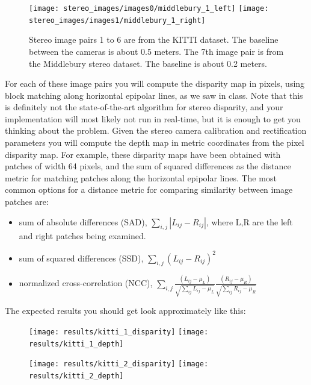 \documentclass[a4paper,10pt]{article}
\begin{document}
    
\begin{figure}[h!]
  \begin{center}    
    \texttt{[image: stereo\_images/images0/middlebury\_1\_left]}
    \texttt{[image: stereo\_images/images1/middlebury\_1\_right]}
  \end{center} 
  \caption{Stereo image pairs 1 to 6 are from the KITTI dataset. The baseline between the cameras is about 0.5 meters. The 7th image pair is from the Middlebury stereo dataset. The baseline is about 0.2 meters.}
  \label{fig:kitti_stereo}
\end{figure}
\noindent For each of these image pairs you will compute the disparity map in pixels, using block matching along horizontal epipolar lines, as we saw in class. Note that this is definitely not the state-of-the-art
algorithm for stereo disparity, and your implementation will most likely not run in real-time, but it is enough to get you thinking about the problem. 
\newline
\newline
\noindent Given the stereo camera calibration and rectification parameters 
you will compute the depth map in metric coordinates from the pixel disparity map. For example, these disparity maps have been obtained with patches of width 64 pixels, and the sum of squared differences as the distance 
metric for matching patches along the horizontal epipolar lines. The most common options for a distance metric for comparing similarity between image patches are:
\begin{itemize}
 \item sum of absolute differences (SAD), $\sum_{i,j}|L_{ij} - R_{ij}|$, where L,R are the left and right patches being examined.
 \item sum of squared differences (SSD), $\sum_{i,j}(L_{ij} - R_{ij})^2$
 \item normalized cross-correlation (NCC), $\sum_{i,j} \frac{(L_{ij} - \mu_L)}{\sqrt{\sum_{ij}{L_{ij} - \mu_L}}} \frac{(R_{ij} - \mu_R)}{\sqrt{\sum_{ij}{R_{ij} - \mu_R}}}$
\end{itemize}
\noindent The expected results you should get look approximately like this: 
\begin{figure}[h!]
  \begin{center}
    \texttt{[image: results/kitti\_1\_disparity]}
    \texttt{[image: results/kitti\_1\_depth]}
   \end{center}
\end{figure}
    
\begin{figure}[h!]
  \begin{center}
    \texttt{[image: results/kitti\_2\_disparity]}
    \texttt{[image: results/kitti\_2\_depth]}
   \end{center}
\end{figure}
\end{document}
